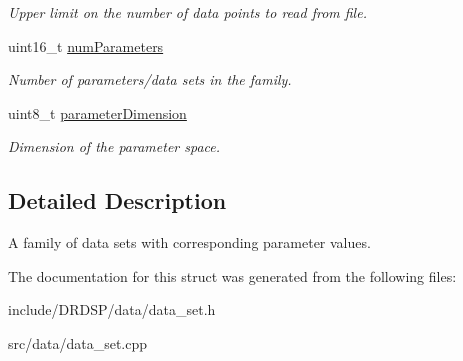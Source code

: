 \begin{DoxyCompactItemize}
\begin{DoxyCompactList}\small\item\em Upper limit on the number of data points to read from file. \end{DoxyCompactList}\item 
\hypertarget{struct_d_r_d_s_p_1_1_data_system_ab6c8c9e69467d53990254ecdcbf5e073}{uint16\-\_\-t \hyperlink{struct_d_r_d_s_p_1_1_data_system_ab6c8c9e69467d53990254ecdcbf5e073}{num\-Parameters}}\label{struct_d_r_d_s_p_1_1_data_system_ab6c8c9e69467d53990254ecdcbf5e073}

\begin{DoxyCompactList}\small\item\em Number of parameters/data sets in the family. \end{DoxyCompactList}\item 
\hypertarget{struct_d_r_d_s_p_1_1_data_system_ae4c6d5195272938097c0f9b01c18b4e0}{uint8\-\_\-t \hyperlink{struct_d_r_d_s_p_1_1_data_system_ae4c6d5195272938097c0f9b01c18b4e0}{parameter\-Dimension}}\label{struct_d_r_d_s_p_1_1_data_system_ae4c6d5195272938097c0f9b01c18b4e0}

\begin{DoxyCompactList}\small\item\em Dimension of the parameter space. \end{DoxyCompactList}\end{DoxyCompactItemize}


\subsection{Detailed Description}
A family of data sets with corresponding parameter values. 

The documentation for this struct was generated from the following files\-:\begin{DoxyCompactItemize}
\item 
include/\-D\-R\-D\-S\-P/data/data\-\_\-set.\-h\item 
src/data/data\-\_\-set.\-cpp\end{DoxyCompactItemize}

